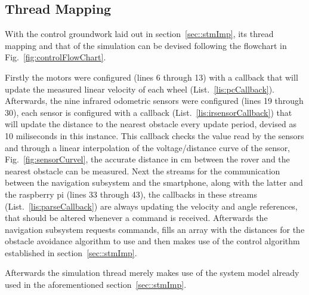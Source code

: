 \subsection{Thread Mapping}
\label{sec:control-thread-mapping}
With the control groundwork laid out in section~\ref{sec::stmImp}, its thread mapping and that of the simulation can be devised following the flowchart in Fig.~\ref{fig:controlFlowChart}.
 
Firstly the motors were configured (lines 6 through 13) with a callback that will update the measured linear velocity of each wheel (List.~\ref{lis:pcCallback}). Afterwards, the nine infrared odometric sensors were configured (lines 19 through 30), each sensor is configured with a callback (List.~\ref{lis:irsensorCallback}) that will update the distance to the nearest obstacle every update period, devised as 10 miliseconds in this instance. This callback checks the value read by the sensors and through a linear interpolation of the voltage/distance curve of the sensor, Fig.~\ref{fig:sensorCurvel}, the accurate distance in cm between the rover and the nearest obstacle can be measured. Next the streams for the communication between the navigation subsystem and the smartphone, along with the latter and the raspberry pi (lines 33 through 43), the callbacks in these streams (List.~\ref{lis:parseCallback}) are always updating the velocity and angle references, that should be altered whenever a command is received. Afterwards the navigation subsystem requests commands, fills an array with the distances for the obstacle avoidance algorithm to use and then makes use of the control algorithm established in section~\ref{sec::stmImp}.
 
 
 

Afterwards the simulation thread merely makes use of the system model already used in the aforementioned section~\ref{sec::stmImp}.
 

